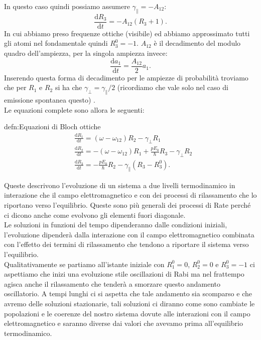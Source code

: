 In questo caso quindi possiamo assumere $\gamma_\parallel = -A_{12}$:
\[
    \frac{\text{d} R_3}{\text{d} t} = -A_{12}\left(R_3+1\right)
.\] 
In cui abbiamo preso frequenze ottiche (visibile) ed abbiamo approssimato tutti gli atomi nel fondamentale quindi $R_3^0 = -1$. 
$A_{12}$  è il decadimento del modulo quadro dell'ampiezza, per la singola ampiezza invece:
\[
\frac{\text{d} a_1}{\text{d} t} = \frac{A_{12}}{2}a_1
.\] 
Inserendo questa forma di decadimento per le ampiezze di probabilità troviamo che per $R_1$  e $R_2$  si ha che $\gamma_\perp  = \gamma_\parallel /2$ (ricordiamo che vale solo nel caso di emissione spontanea questo) .\\
Le equazioni complete sono allora le seguenti:
\begin{defn}{defn:Equazioni di Bloch ottiche}
\[\begin{aligned}
    &\frac{\text{d} R_1}{\text{d} t} = \left(\omega-\omega_{12}\right)R_2
    - \gamma_\perp R_1\\
    &\frac{\text{d} R_2}{\text{d} t} = - \left(\omega-\omega_{12}\right)R_1 +
    \frac{pE_0}{\hbar }R_3-\gamma_\perp R_2\\
    &\frac{\text{d} R_3}{\text{d} t} = -\frac{pE_0}{\hbar }R_2 - 
    \gamma_\parallel\left(R_3-R_3^0\right)
.\end{aligned}\]
\end{defn}
Queste descrivono l'evoluzione di un sistema a due livelli termodinamico in interazione che il campo elettromagnetico e con dei processi di rilassamento che lo riportano verso l'equilibrio. 
Queste sono più generali dei processi di Rate perché ci dicono anche come evolvono gli elementi fuori diagonale.\\
Le soluzioni in funzioni del tempo dipenderanno dalle condizioni iniziali, l'evoluzione dipenderà dalla interazione con il campo elettromagnetico combinata con l'effetto dei termini di rilassamento che tendono a riportare il sistema verso l'equilibrio.\\
Qualitativamente se partiamo all'istante iniziale con $R_1^0=0$, $R_2^0 = 0$ e $R_3^0= -1$ ci aspettiamo che inizi una evoluzione stile oscillazioni di Rabi ma nel frattempo agisca anche il rilassamento che tenderà a smorzare questo andamento oscillatorio. A tempi lunghi ci si aspetta che tale andamento sia scomparso e che avremo delle soluzioni stazionarie, tali soluzioni ci diranno come sono cambiate le popolazioni e le coerenze del nostro sistema dovute alle interazioni con il campo elettromagnetico e saranno diverse dai valori che avevamo prima all'equilibrio termodinamico. \\
